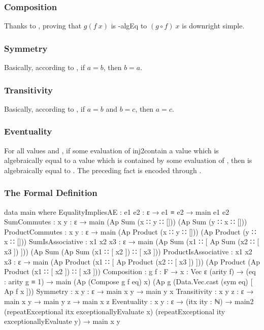 \documentclass{report}
\begin{document}
\subsubsection{Composition}
Thanks to , proving that \(g \left(f\ x\right)\) is -\gls{algEq} to \(\left(g \circ f\right)\ x\) is downright simple.

\subsubsection{Symmetry}
Basically, according to , if \(a = b\), then \(b = a\).

\subsubsection{Transitivity}
Basically, according to , if \(a = b\) and \(b = c\), then \(a = c\).

\subsubsection{Eventuality}
For all  values  and , if some evaluation of  \gls{inj2contain} a value which is algebraically equal to a value which is contained by some evaluation of , then  is algebraically equal to .  The preceding fact is encoded through .

\subsubsection{The Formal Definition}

\begin{code}
    data main where
      EqualityImpliesAE : {e1 e2 : ε} → e1 ≡ e2 → main e1 e2
      SumCommutes :
        {x y : ε} → main (Ap Sum (x ∷ y ∷ [])) (Ap Sum (y ∷ x ∷ []))
      ProductCommutes :
        {x y : ε} → main (Ap Product (x ∷ y ∷ [])) (Ap Product (y ∷ x ∷ []))
      SumIsAssociative :
        {x1 x2 x3 : ε} →
        main (Ap Sum (x1 ∷ [ Ap Sum (x2 ∷ [ x3 ]) ]))
             (Ap Sum (Ap Sum (x1 ∷ [ x2 ]) ∷ [ x3 ]))
      ProductIsAssociative :
        {x1 x2 x3 : ε} →
        main (Ap Product (x1 ∷ [ Ap Product (x2 ∷ [ x3 ]) ]))
             (Ap Product (Ap Product (x1 ∷ [ x2 ]) ∷ [ x3 ]))
      Composition : {g f : F} →
                    {x : Vec ε (arity f)} →
                    (eq : arity g ≡ 1) →
                    main (Ap (Compose g f eq) x)
                         (Ap g (Data.Vec.cast (sym eq) [ Ap f x ]))
      Symmetry : {x y : ε} → main x y → main y x
      Transitivity : {x y z : ε} → main x y → main y z → main x z
      Eventuality :
        {x y : ε} →
        (itx ity : ℕ) →
        main2 (repeatExceptional itx exceptionallyEvaluate x)
              (repeatExceptional ity exceptionallyEvaluate y) →
        main x y
\end{code}
\end{document}
